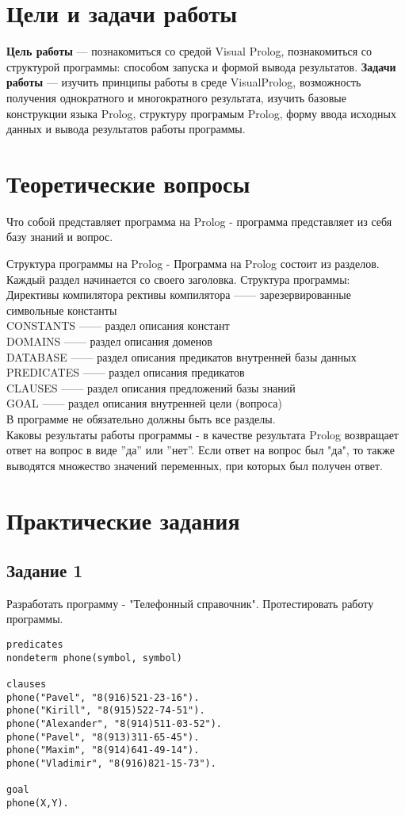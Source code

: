 \chapter{Цели и задачи работы}
\textbf{Цель работы} --- познакомиться со средой Visual Prolog, познакомиться со структурой программы: способом запуска и формой вывода результатов.
\textbf{Задачи работы} --- изучить принципы работы в среде VisualProlog, возможность получения однократного и многократного результата, изучить базовые конструкции языка Prolog, структуру програмым Prolog, форму ввода исходных данных и вывода результатов работы программы.

\chapter{Теоретические вопросы}
Что собой представляет программа на Prolog - программа представляет из себя базу знаний и вопрос.

Структура программы на Prolog - Программа на Prolog состоит из разделов. Каждый раздел начинается со своего заголовка. Структура программы:\\
Директивы компилятора рективы компилятора —— зарезервированные символьные константы\\
CONSTANTS —— раздел описания констант\\
DOMAINS —— раздел описания доменов\\
DATABASE —— раздел описания предикатов внутренней базы данных\\
PREDICATES —— раздел описания предикатов\\
CLAUSES —— раздел описания предложений базы знаний\\
GOAL —— раздел описания внутренней цели (вопроса)\\
В программе не обязательно должны быть все разделы.\\

Каковы результаты работы программы - в качестве результата Prolog возвращает ответ на вопрос в виде ''да'' или ''нет''. Если ответ на вопрос был "да", то также выводятся множество значений переменных, при которых был получен ответ.\\

\chapter{Практические задания}
\section{Задание 1}
Разработать программу - "Телефонный справочник". Протестировать работу программы.
\begin{lstlisting}
predicates
nondeterm phone(symbol, symbol)

clauses
phone("Pavel", "8(916)521-23-16").
phone("Kirill", "8(915)522-74-51").
phone("Alexander", "8(914)511-03-52").
phone("Pavel", "8(913)311-65-45").
phone("Maxim", "8(914)641-49-14").
phone("Vladimir", "8(916)821-15-73").

goal
phone(X,Y).
\end{lstlisting}

